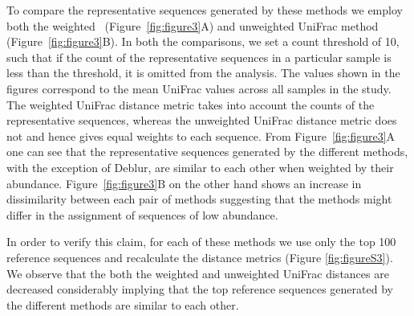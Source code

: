   To compare the representative sequences generated by these methods we employ both the weighted~\cite{Lozupone2007} (Figure~\ref{fig:figure3}A) and unweighted UniFrac method~\cite{Lozupone2005} (Figure~\ref{fig:figure3}B).
  In both the comparisons, we set a count threshold of 10, such that if the count of the representative sequences in a particular sample is less than the threshold, it is omitted from the analysis.
  The values shown in the figures correspond to the mean UniFrac values across all samples in the study.
  The weighted UniFrac distance metric takes into account the counts of the representative sequences, whereas the unweighted UniFrac distance metric does not and hence gives equal weights to each sequence.
  From Figure~\ref{fig:figure3}A one can see that the representative sequences generated by the different methods, with the exception of Deblur, are similar to each other when weighted by their abundance.
  Figure~\ref{fig:figure3}B on the other hand shows an increase in dissimilarity between each pair of methods suggesting that the methods might differ in the assignment of sequences of low abundance.

  In order to verify this claim, for each of these methods we use only the top 100 reference sequences and recalculate the distance metrics (Figure \ref{fig:figureS3}).
  We observe that the both the weighted and unweighted UniFrac distances are decreased considerably implying that the top reference sequences generated by the different methods are similar to each other.

